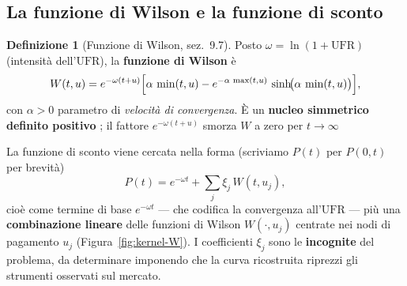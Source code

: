 \documentclass[11pt,a4paper]{article}
\theoremstyle{plain}
\theoremstyle{definition}
\newtheorem{definizione}[teorema]{Definizione}
\theoremstyle{remark}
\newcommand{\UFR}{\ensuremath{\mathrm{UFR}}}
\newcommand{\Qmat}{\mathbf{Q}}
\begin{document}
%
%

\subsection{La funzione di Wilson e la funzione di sconto}
\label{sub:kernel-W}

\begin{definizione}[Funzione di Wilson, \cite{eiopa2025} sez.~9.7]
Posto $\omega = \ln(1+\UFR)$ (intensit\`a dell'$\UFR$), la \textbf{funzione di Wilson} \`e
\[
  W(t,u) = e^{-\omega(t+u)}\Bigl[\alpha\,\min(t,u)
           - e^{-\alpha\,\max(t,u)}\,\sinh\!\bigl(\alpha\,\min(t,u)\bigr)\Bigr],
\]
con $\alpha>0$ parametro di \emph{velocit\`a di convergenza}. \`E un \textbf{nucleo simmetrico
definito positivo} \cite{fasshauer2007,lageras2016}; il fattore $e^{-\omega(t+u)}$ smorza $W$ a zero per
$t\to\infty$%
\end{definizione}

La funzione di sconto viene cercata nella forma (scriviamo $P(t)$ per $P(0,t)$ per brevit\`a)
\begin{equation}
  P(t) = e^{-\omega t} + \textstyle\sum_{j} \xi_j\, W(t,u_j),
  \label{eq:sw-P-W}
\end{equation}
cio\`e come termine di base $e^{-\omega t}$ --- che codifica la convergenza all'$\UFR$ --- pi\`u
una \textbf{combinazione lineare} delle funzioni di Wilson $W(\cdot,u_j)$ centrate nei nodi di
pagamento $u_j$ (Figura~\ref{fig:kernel-W}). I coefficienti $\xi_j$ sono le \textbf{incognite}
del problema, da determinare imponendo che la curva ricostruita riprezzi gli strumenti
osservati sul mercato.
\end{document}
